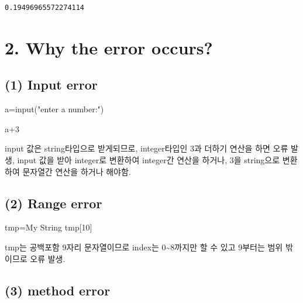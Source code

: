 \documentclass[
  letterpaper,
  DIV=11,
  numbers=noendperiod]{scrreprt}
\newenvironment{Shaded}{\begin{snugshade}}{\end{snugshade}}
\newcommand{\BuiltInTok}[1]{\textcolor[rgb]{0.00,0.23,0.31}{#1}}
\newcommand{\DecValTok}[1]{\textcolor[rgb]{0.68,0.00,0.00}{#1}}
\newcommand{\NormalTok}[1]{\textcolor[rgb]{0.00,0.23,0.31}{#1}}
\newcommand{\OperatorTok}[1]{\textcolor[rgb]{0.37,0.37,0.37}{#1}}
\newcommand{\StringTok}[1]{\textcolor[rgb]{0.13,0.47,0.30}{#1}}
\begin{document}
\begin{verbatim}
0.19496965572274114
\end{verbatim}

\section*{2. Why the error occurs?}\label{why-the-error-occurs}


\subsection*{(1) Input error}\label{input-error}

\begin{Shaded}
\begin{Highlighting}[]
\NormalTok{a}\OperatorTok{=}\BuiltInTok{input}\NormalTok{(}\StringTok{"enter a number:"}\NormalTok{)}

\NormalTok{a}\OperatorTok{+}\DecValTok{3}
\end{Highlighting}
\end{Shaded}

input 값은 string타입으로 받게되므로, integer타입인 3과 더하기 연산을
하면 오류 발생, input 값을 받아 integer로 변환하여 integer간 연산을
하거나, 3을 string으로 변환하여 문자열간 연산을 하거나 해야함.

\subsection*{(2) Range error}\label{range-error}

\begin{Shaded}
\begin{Highlighting}[]
\NormalTok{tmp}\OperatorTok{=}\StringTok{\textquotesingle{}My String\textquotesingle{}}
\NormalTok{tmp[}\DecValTok{10}\NormalTok{]}
\end{Highlighting}
\end{Shaded}

tmp는 공백포함 9자리 문자열이므로 index는 0\textasciitilde8까지만 할 수
있고 9부터는 범위 밖이므로 오류 발생.

\subsection*{(3) method error}\label{method-error}
\end{document}
